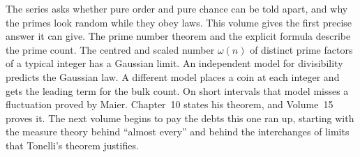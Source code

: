 The series asks whether pure order and pure chance can be told apart, and why the primes look random while they obey laws. This volume gives the first precise answer it can give. The prime number theorem and the explicit formula describe the prime count. The centred and scaled number $\omega(n)$ of distinct prime factors of a typical integer has a Gaussian limit. An independent model for divisibility predicts the Gaussian law. A different model places a coin at each integer and gets the leading term for the bulk count. On short intervals that model misses a fluctuation proved by Maier. Chapter~10 states his theorem, and Volume~15 proves it. The next volume begins to pay the debts this one ran up, starting with the measure theory behind ``almost every'' and behind the interchanges of limits that Tonelli's theorem justifies.
